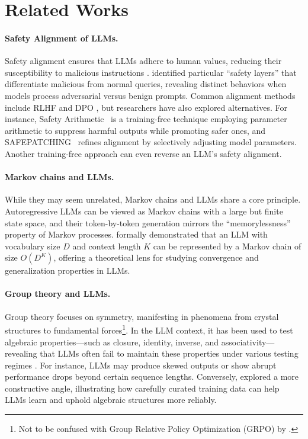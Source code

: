 \section{Related Works}
\label{sec:related}

\paragraph{Safety Alignment of LLMs.}
Safety alignment ensures that LLMs adhere to human values, reducing their susceptibility to malicious instructions \citep{yi2024vulnerability}. \citet{li2024safety} identified particular ``safety layers” that differentiate malicious from normal queries, revealing distinct behaviors when models process adversarial versus benign prompts. Common alignment methods include RLHF \citep{ouyang_training_2022, bai2022training} and DPO \citep{rafailov2024direct}, but researchers have also explored alternatives. For instance, Safety Arithmetic~\citep{hazra2024safety} is a training-free technique employing parameter arithmetic to suppress harmful outputs while promoting safer ones, and SAFEPATCHING~\citep{zhao2024towards, kim2024decoupling} refines alignment by selectively adjusting model parameters. Another training-free approach \citep{zhou2024emulated} can even reverse an LLM’s safety alignment.

\paragraph{Markov chains and LLMs.}
While they may seem unrelated, Markov chains and LLMs share a core principle. Autoregressive LLMs can be viewed as Markov chains with a large but finite state space, and their token-by-token generation mirrors the “memorylessness” property of Markov processes. \citet{zekri2024large} formally demonstrated that an LLM with vocabulary size $D$ and context length $K$ can be represented by a Markov chain of size $O(D^K)$, offering a theoretical lens for studying convergence and generalization properties in LLMs.

\paragraph{Group theory and LLMs.}  
Group theory focuses on symmetry, manifesting in phenomena from crystal structures to fundamental forces\footnote{Not to be confused with Group Relative Policy Optimization (GRPO) \citep{shao2024deepseekmath} by \citep{guo2025deepseek}.}. In the LLM context, it has been used to test algebraic properties—such as closure, identity, inverse, and associativity—revealing that LLMs often fail to maintain these properties under various testing regimes \citep{imani2024exploring}. For instance, LLMs may produce skewed outputs or show abrupt performance drops beyond certain sequence lengths. Conversely, \citet{chang2024unraveling} explored a more constructive angle, illustrating how carefully curated training data can help LLMs learn and uphold algebraic structures more reliably.